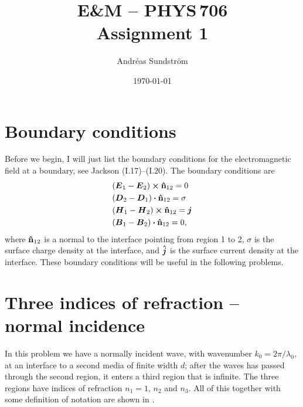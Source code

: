 \documentclass[11pt,letter, swedish, english
]{article}
\begin{document}




\title{E\&M -- PHYS\,706 \\
Assignment 1}
\author{Andréas Sundström}
\date{\today}

\maketitle


\section*{Boundary conditions}
Before we begin, I will just list the boundary conditions for the
electromagnetic field at a boundary, see Jackson (I.17)--(I.20). The
boundary conditions are
\begin{align}
&(\vb*E_1 - \vb*E_2)\cross\vu{n}_{12} = 0     \label{eq:01}\\
&(\vb*D_2 - \vb*D_1)\vdot\vu{n}_{12} = \sigma \label{eq:02}\\
&(\vb*H_1 - \vb*H_2)\cross\vu{n}_{12} = \vb*j \label{eq:03}\\
&(\vb*B_1 - \vb*B_2)\vdot\vu{n}_{12} = 0,     \label{eq:04}
\end{align}
where $\vu{n}_{12}$ is a normal to the interface pointing from region 1
to 2, $\sigma$ is the surface charge density at the interface, and
$\vu*j$ is the surface current density at the interface. These
boundary conditions will be useful in the following problems. 

\section{Three indices of refraction -- normal incidence}
\newcommand{\Ep}{{\mathcal{E}_1^+}}
\newcommand{\Epp}{{\mathcal{E}_2^+}}
\newcommand{\Eppp}{{\mathcal{E}_3^+}}
\newcommand{\Em}{{\mathcal{E}_1^-}}
\newcommand{\Emm}{{\mathcal{E}_2^-}}

In this problem we have a normally incident wave, with wavenumber
$k_0=2\pi/\lambda_0$, at an interface to a second media of finite
width $d$; after the waves has passed through the second region, it
enters a third region that is infinite. The three regions have indices
of refraction $n_1=1$, $n_2$ and $n_3$. All of this together with some 
definition of notation are shown in .
\end{document}

